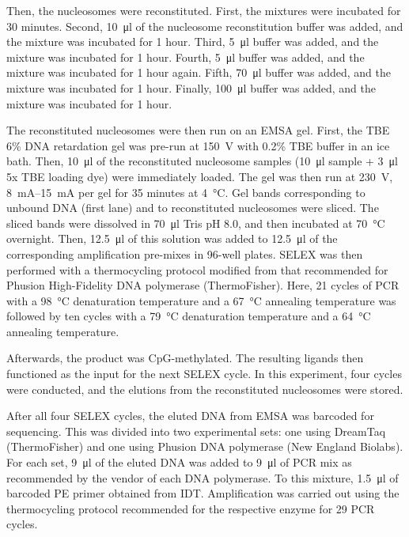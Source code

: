 \documentclass[parskip=full, numbers=noenddot]{scrreprt}
\begin{document}
Then, the nucleosomes were reconstituted. First, the mixtures were incubated for 30 minutes. Second, \SI{10}{\micro\litre} of the nucleosome reconstitution buffer was added, and the mixture was incubated for 1 hour. Third, \SI{5}{\micro\litre} buffer was added, and the mixture was incubated for 1 hour. Fourth, \SI{5}{\micro\litre} buffer was added, and the mixture was incubated for 1 hour again. Fifth, \SI{70}{\micro\litre} buffer was added, and the mixture was incubated for 1 hour. Finally, \SI{100}{\micro\litre} buffer was added, and the mixture was incubated for 1 hour.

The reconstituted nucleosomes were then run on an EMSA gel. First, the TBE 6\% DNA retardation gel was pre-run at \SI{150}{\volt} with 0.2\% TBE buffer in an ice bath. Then, \SI{10}{\micro\litre} of the reconstituted nucleosome samples (\SI{10}{\micro\litre} sample + \SI{3}{\micro\litre} 5x TBE loading dye) were immediately loaded. The gel was then run at \SI{230}{\volt}, \SIrange{8}{15}{\milli\ampere} per gel for 35 minutes at \SI{4}{\celsius}. Gel bands corresponding to unbound DNA (first lane) and to reconstituted nucleosomes were sliced. The sliced bands were dissolved in \SI{70}{\micro\litre} Tris pH 8.0, and then incubated at \SI{70}{\celsius} overnight. Then, \SI{12.5}{\micro\litre} of this solution was added to \SI{12.5}{\micro\litre} of the corresponding amplification pre-mixes in 96-well plates. SELEX was then performed with a thermocycling protocol modified from that recommended for Phusion High-Fidelity DNA polymerase (ThermoFisher). Here, 21 cycles of PCR with a \SI{98}{\celsius} denaturation temperature and a \SI{67}{\celsius} annealing temperature was followed by ten cycles with a \SI{79}{\celsius} denaturation temperature and a \SI{64}{\celsius} annealing temperature.

Afterwards, the product was CpG-methylated. The resulting ligands then functioned as the input for the next SELEX cycle. In this experiment, four cycles were conducted, and the elutions from the reconstituted nucleosomes were stored.


After all four SELEX cycles, the eluted DNA from EMSA was barcoded for sequencing. This was divided into two experimental sets: one using DreamTaq (ThermoFisher) and one using Phusion DNA polymerase (New England Biolabs). For each set, \SI{9}{\micro\litre} of the eluted DNA was added to \SI{9}{\micro\litre} of PCR mix as recommended by the vendor of each DNA polymerase. To this mixture, \SI{1.5}{\micro\litre} of barcoded PE primer obtained from IDT. Amplification was carried out using the thermocycling protocol recommended for the respective enzyme for 29 PCR cycles.
\end{document}
